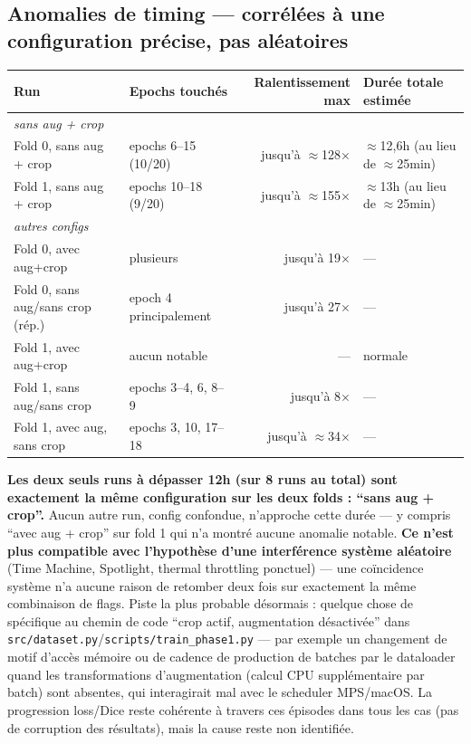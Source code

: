 \subsection{Anomalies de timing --- corrélées à une configuration précise, pas
aléatoires}

\begin{center}
\begin{tabular}{llrl}
\toprule
Run & Epochs touchés & Ralentissement max & Durée totale estimée \\
\midrule
\multicolumn{4}{l}{\emph{sans aug + crop}} \\
Fold 0, sans aug + crop & epochs 6--15 (10/20) & jusqu'à $\approx$128$\times$ &
    $\approx$12,6h (au lieu de $\approx$25min) \\
Fold 1, sans aug + crop & epochs 10--18 (9/20) & jusqu'à $\approx$155$\times$ &
    $\approx$13h (au lieu de $\approx$25min) \\
\midrule
\multicolumn{4}{l}{\emph{autres configs}} \\
Fold 0, avec aug+crop & plusieurs & jusqu'à 19$\times$ & --- \\
Fold 0, sans aug/sans crop (rép.) & epoch 4 principalement & jusqu'à 27$\times$ & --- \\
Fold 1, avec aug+crop & aucun notable & --- & normale \\
Fold 1, sans aug/sans crop & epochs 3--4, 6, 8--9 & jusqu'à 8$\times$ & --- \\
Fold 1, avec aug, sans crop & epochs 3, 10, 17--18 & jusqu'à $\approx$34$\times$ & --- \\
\bottomrule
\end{tabular}
\end{center}

\textbf{Les deux seuls runs à dépasser 12h (sur 8 runs au total) sont exactement la
même configuration sur les deux folds : ``sans aug + crop''.} Aucun autre run,
config confondue, n'approche cette durée --- y compris ``avec aug + crop'' sur fold 1
qui n'a montré aucune anomalie notable. \textbf{Ce n'est plus compatible avec
l'hypothèse d'une interférence système aléatoire} (Time Machine, Spotlight, thermal
throttling ponctuel) --- une coïncidence système n'a aucune raison de retomber deux
fois sur exactement la même combinaison de flags. Piste la plus probable désormais :
quelque chose de spécifique au chemin de code ``crop actif, augmentation
désactivée'' dans \texttt{src/dataset.py}/\texttt{scripts/train\_phase1.py} --- par
exemple un changement de motif d'accès mémoire ou de cadence de production de
batches par le dataloader quand les transformations d'augmentation (calcul CPU
supplémentaire par batch) sont absentes, qui interagirait mal avec le scheduler
MPS/macOS. La progression loss/Dice reste cohérente à travers ces épisodes dans tous
les cas (pas de corruption des résultats), mais la cause reste non identifiée.

